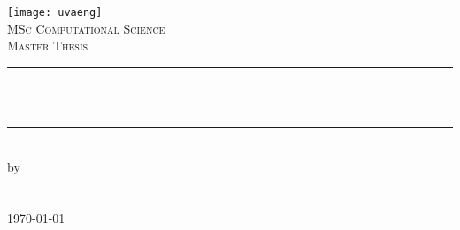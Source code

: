 \documentclass{article}
\newcommand{\red}[1]{{\color{red}{#1}}}
\begin{document}
\begin{titlepage}

\newcommand{\HRule}{\rule{\linewidth}{0.5mm}} %
\center %
 

\texttt{[image: uvaeng]}\\[2.5cm]
\textsc{\Large MSc Computational Science}\\[0.2cm]
\textsc{\Large Master Thesis}\\[0.5cm] 


\HRule \\[0.4cm]
{ \huge \bfseries \red{Pondering in Artificial Neural Networks}}\\[0.4cm] %
\HRule \\[0.5cm]
 

by\\[0.2cm]
\textsc{\Large \red{Anand Kumar Singh}}\\[0.2cm] %
\red{11392045}\\[1cm]



{\Large \today}\\[1cm] %

\red{42 ECTS}\\ %


\end{titlepage}
\end{document}

